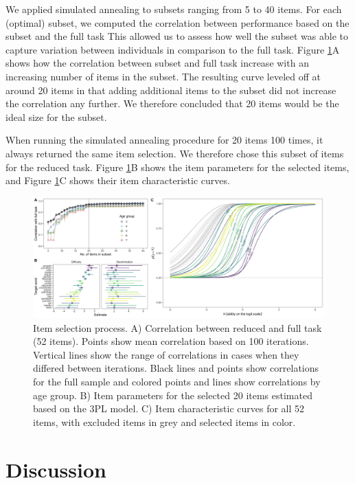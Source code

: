 \documentclass[
  man,floatsintext]{apa6}
\begin{document}
We applied simulated annealing to subsets ranging from 5 to 40 items. For each (optimal) subset, we computed the correlation between performance based on the subset and the full task This allowed us to assess how well the subset was able to capture variation between individuals in comparison to the full task. Figure \ref{fig:fig4}A shows how the correlation between subset and full task increase with an increasing number of items in the subset. The resulting curve leveled off at around 20 items in that adding additional items to the subset did not increase the correlation any further. We therefore concluded that 20 items would be the ideal size for the subset.

When running the simulated annealing procedure for 20 items 100 times, it always returned the same item selection. We therefore chose this subset of items for the reduced task. Figure \ref{fig:fig4}B shows the item parameters for the selected items, and Figure \ref{fig:fig4}C shows their item characteristic curves.



\begin{figure}

{\centering \includegraphics[width=1\linewidth]{../graphs/item_fig2} 

}

\caption{Item selection process. A) Correlation between reduced and full task (52 items). Points show mean correlation based on 100 iterations. Vertical lines show the range of correlations in cases when they differed between iterations. Black lines and points show correlations for the full sample and colored points and lines show correlations by age group. B) Item parameters for the selected 20 items estimated based on the 3PL model. C) Item characteristic curves for all 52 items, with excluded items in grey and selected items in color.}\label{fig:fig4}
\end{figure}

\hypertarget{discussion}{%
\section{Discussion}\label{discussion}}
\end{document}
